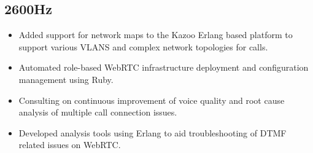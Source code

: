 \documentclass[11pt,a4paper,sans]{moderncv}   %
\begin{document}
\subsection{2600Hz}
  \begin{itemize}
  \item Added support for network maps to the Kazoo Erlang based platform to support various VLANS and complex network topologies for calls.
  \item Automated role-based WebRTC infrastructure deployment and configuration management using Ruby.
  \item Consulting on continuous improvement of voice quality and root cause analysis of multiple call connection issues.
  \item Developed analysis tools using Erlang to aid troubleshooting of DTMF related issues on WebRTC.
  \end{itemize}
\end{document}
